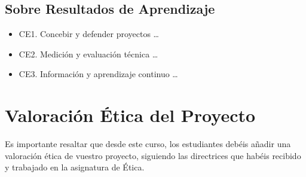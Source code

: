\section{Sobre Resultados de Aprendizaje}
\begin{itemize}
  \item CE1. Concebir y defender proyectos \dots
  \item CE2. Medición y evaluación técnica \dots
  \item CE3. Información y aprendizaje continuo \dots
\end{itemize}

\chapter{Valoración Ética del Proyecto}

Es importante resaltar que desde este curso, los estudiantes debéis añadir una valoración ética de vuestro proyecto, siguiendo las directrices que habéis recibido y trabajado en la asignatura de Ética.

